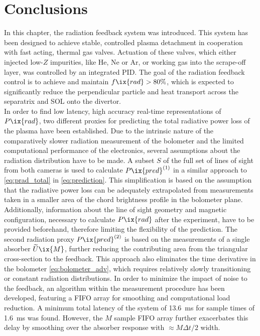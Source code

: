     \section{Conclusions}\label{sec:conclusionschap2}%
%
        In this chapter, the radiation feedback system was introduced. This system has been designed to achieve stable, controlled plasma detachment in cooperation with fast acting, thermal gas valves. Actuation of these valves, which either injected low-$Z$ impurities, like He, Ne or Ar, or working gas into the scrape-off layer, was controlled by an integrated PID. The goal of the radiation feedback control is to achieve and maintain $f\ix{rad}>80\%$, which is expected to significantly reduce the perpendicular particle and heat transport across the separatrix and SOL onto the divertor.\\%
        In order to find low latency, high accuracy real-time representations of $P\ix{rad}$, two different proxies for predicting the total radiative power loss of the plasma have been established. Due to the intrinsic nature of the comparatively slower radiation measurement of the bolometer and the limited computational performance of the electronics, several assumptions about the radiation distribution have to be made. A subset $S$ of the full set of lines of sight from both cameras is used to calculate $P\ix{pred}^{\left(1\right)}$ in a similar approach to \cref{eq:prad_total} in \cref{eq:prediction}. This simplification is based on the assumption that the radiative power loss can be adequately extrapolated from measurements taken in a smaller area of the chord brightness profile in the bolometer plane. Additionally, information about the line of sight geometry and magnetic configuration, necessary to calculate $P\ix{rad}$ after the experiment, have to be provided beforehand, therefore limiting the flexibility of the prediction. The second radiation proxy $P\ix{pred}^{\left(2\right)}$ is based on the measurements of a single absorber $\widetilde{U}\ix{M}$, further reducing the contributing area from the triangular cross-section to the feedback. This approach also eliminates the time derivative in the bolometer \cref{eq:bolometer_adv}, which requires relatively slowly transitioning or constant radiation distributions. In order to minimize the impact of noise to the feedback, an algorithm within the measurement procedure has been developed, featuring a FIFO array for smoothing and computational load reduction. A minimum total latency of the system of \SI{13.6}{\milli\second} for sample times of \SI{1.6}{\milli\second} was found. However, the $M$ sample FIFO array further exacerbates this delay by smoothing over the absorber response with $\approx M\Delta t/2$ width.\\%
